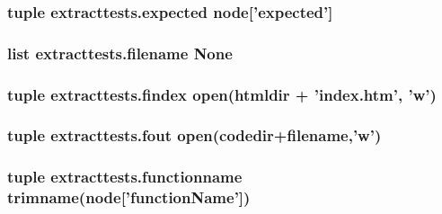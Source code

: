 \hypertarget{namespaceextracttests_a397acca50bcc6d297d4a1d558387d560}{
\subsubsection[{expected}]{\setlength{\rightskip}{0pt plus 5cm}tuple extracttests.\-expected node\mbox{[}'expected'\mbox{]}}}\label{namespaceextracttests_a397acca50bcc6d297d4a1d558387d560}
\hypertarget{namespaceextracttests_ae8e72c8ddfad0acc854b69f255560652}{
\subsubsection[{filename}]{\setlength{\rightskip}{0pt plus 5cm}list extracttests.\-filename None}}\label{namespaceextracttests_ae8e72c8ddfad0acc854b69f255560652}
\hypertarget{namespaceextracttests_a0e689b33baed4a504201858c00f92221}{
\subsubsection[{findex}]{\setlength{\rightskip}{0pt plus 5cm}tuple extracttests.\-findex open({\bf htmldir} + 'index.\-htm', 'w')}}\label{namespaceextracttests_a0e689b33baed4a504201858c00f92221}
\hypertarget{namespaceextracttests_a0c99f776e2d3811a9c8b0889b903aa66}{
\subsubsection[{fout}]{\setlength{\rightskip}{0pt plus 5cm}tuple extracttests.\-fout open({\bf codedir}+{\bf filename},'w')}}\label{namespaceextracttests_a0c99f776e2d3811a9c8b0889b903aa66}
\hypertarget{namespaceextracttests_afdfa35e11e3c89c35f3f921ec9f6b4f9}{
\subsubsection[{functionname}]{\setlength{\rightskip}{0pt plus 5cm}tuple extracttests.\-functionname {\bf trimname}(node\mbox{[}'{\bf function\-Name}'\mbox{]})}}\label{namespaceextracttests_afdfa35e11e3c89c35f3f921ec9f6b4f9}
